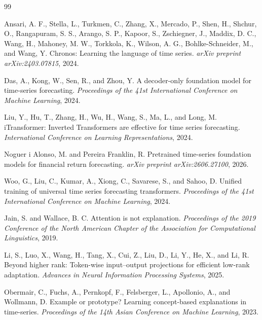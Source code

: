 \documentclass[11pt]{article}
\begin{document}
\begin{thebibliography}{99}

Ansari, A. F., Stella, L., Turkmen, C., Zhang, X., Mercado, P.,
Shen, H., Shchur, O., Rangapuram, S. S., Arango, S. P.,
Kapoor, S., Zschiegner, J., Maddix, D. C., Wang, H.,
Mahoney, M. W., Torkkola, K., Wilson, A. G., Bohlke-Schneider, M.,
and Wang, Y.
\newblock Chronos: Learning the language of time series.
\newblock \emph{arXiv preprint arXiv:2403.07815}, 2024.

Das, A., Kong, W., Sen, R., and Zhou, Y.
\newblock A decoder-only foundation model for time-series forecasting.
\newblock \emph{Proceedings of the 41st International Conference on
Machine Learning}, 2024.

Liu, Y., Hu, T., Zhang, H., Wu, H., Wang, S., Ma, L., and Long, M.
\newblock iTransformer: Inverted Transformers are effective for time series
forecasting.
\newblock \emph{International Conference on Learning Representations}, 2024.

Noguer i Alonso, M. and Pereira Franklin, R.
\newblock Pretrained time-series foundation models for financial return
forecasting.
\newblock \emph{arXiv preprint arXiv:2606.27100}, 2026.

Woo, G., Liu, C., Kumar, A., Xiong, C., Savarese, S., and Sahoo, D.
\newblock Unified training of universal time series forecasting transformers.
\newblock \emph{Proceedings of the 41st International Conference on
Machine Learning}, 2024.

Jain, S. and Wallace, B. C.
\newblock Attention is not explanation.
\newblock \emph{Proceedings of the 2019 Conference of the North American
Chapter of the Association for Computational Linguistics}, 2019.

Li, S., Luo, X., Wang, H., Tang, X., Cui, Z., Liu, D., Li, Y., He, X.,
and Li, R.
\newblock Beyond higher rank: Token-wise input--output projections for
efficient low-rank adaptation.
\newblock \emph{Advances in Neural Information Processing Systems}, 2025.

Obermair, C., Fuchs, A., Pernkopf, F., Felsberger, L., Apollonio, A.,
and Wollmann, D.
\newblock Example or prototype? Learning concept-based explanations in
time-series.
\newblock \emph{Proceedings of the 14th Asian Conference on Machine Learning},
2023.


\end{thebibliography}
\end{document}
